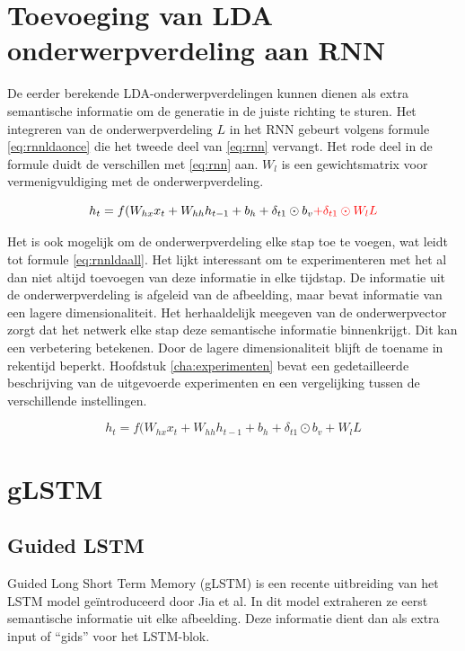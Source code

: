 \section{Toevoeging van LDA onderwerpverdeling aan RNN}
De eerder berekende LDA-onderwerpverdelingen kunnen dienen als extra semantische informatie om de generatie in de juiste richting te sturen. Het integreren van de onderwerpverdeling $L$ in het RNN gebeurt volgens formule \eqref{eq:rnnldaonce} die het tweede deel van \eqref{eq:rnn} vervangt. Het rode deel in de formule duidt de verschillen met \eqref{eq:rnn} aan. $W_l$ is een gewichtsmatrix voor vermenigvuldiging met de onderwerpverdeling.

\begin{equation}
    h_t = f(W_{hx} x_{t} + W_{hh} h_{t-1} + b_h + \delta_{t1} \odot b_v \color{red}{+\delta_{t1} \odot W_lL}
    \color{black}
    \label{eq:rnnldaonce}
\end{equation}

Het is ook mogelijk om de onderwerpverdeling elke stap toe te voegen, wat leidt tot formule \eqref{eq:rnnldaall}. Het lijkt interessant om te experimenteren met het al dan niet altijd toevoegen van deze informatie in elke tijdstap. De informatie uit de onderwerpverdeling is afgeleid van de afbeelding, maar bevat informatie van een lagere dimensionaliteit. Het herhaaldelijk meegeven van de onderwerpvector zorgt dat het netwerk elke stap deze semantische informatie binnenkrijgt. Dit kan een verbetering betekenen. Door de lagere dimensionaliteit blijft de toename in rekentijd beperkt. Hoofdstuk \ref{cha:experimenten} bevat een gedetailleerde beschrijving van de uitgevoerde experimenten en een vergelijking tussen de verschillende instellingen.

\begin{equation}
    h_t = f(W_{hx} x_{t} + W_{hh} h_{t-1} + b_h + \delta_{t1} \odot b_v + W_lL
    \label{eq:rnnldaall}
\end{equation}


\section{gLSTM}
\subsection{Guided LSTM}
Guided Long Short Term Memory (gLSTM) is een recente uitbreiding van het LSTM model ge\"introduceerd door Jia et al.\cite{Fernando2015} In dit model extraheren ze eerst semantische informatie uit elke afbeelding. Deze informatie dient dan als extra input of ``gids'' voor het LSTM-blok.

